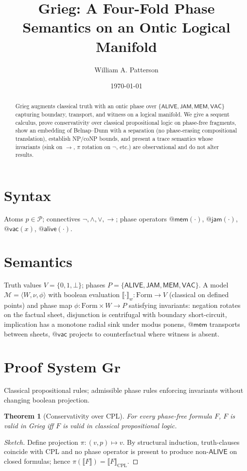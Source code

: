 \documentclass[11pt]{article}
\title{Grieg: A Four-Fold Phase Semantics on an Ontic Logical Manifold}
\author{William A. Patterson}
\date{\today}
\newtheorem{theorem}{Theorem}
\begin{document}
\maketitle

\begin{abstract}
Grieg augments classical truth with an ontic phase over $\{\mathsf{ALIVE},\mathsf{JAM},\mathsf{MEM},\mathsf{VAC}\}$ capturing boundary, transport, and witness on a logical manifold. We give a sequent calculus, prove conservativity over classical propositional logic on phase-free fragments, show an embedding of Belnap--Dunn with a separation (no phase-erasing compositional translation), establish NP/coNP bounds, and present a trace semantics whose invariants (sink on $\to$, $\pi$ rotation on $\neg$, etc.) are observational and do not alter results.
\end{abstract}

\section{Syntax}
Atoms $p\in\mathcal{P}$; connectives $\neg,\wedge,\vee,\to$; phase operators $\mathsf{@mem}(\cdot)$, $\mathsf{@jam}(\cdot)$, $\mathsf{@vac}(x)$, $\mathsf{@alive}(\cdot)$.

\section{Semantics}
Truth values $V=\{0,1,\bot\}$; phases $P=\{\mathsf{ALIVE},\mathsf{JAM},\mathsf{MEM},\mathsf{VAC}\}$. A model $\mathcal{M}=\langle W,\nu,\phi\rangle$ with boolean evaluation $\llbracket\cdot\rrbracket_w:\mathrm{Form}\to V$ (classical on defined points) and phase map $\phi:\mathrm{Form}\times W\to P$ satisfying invariants: negation rotates on the factual sheet, disjunction is centrifugal with boundary short-circuit, implication has a monotone radial sink under modus ponens, $\mathsf{@mem}$ transports between sheets, $\mathsf{@vac}$ projects to counterfactual where witness is absent.

\section{Proof System $\mathbf{G\!r}$}
Classical propositional rules; admissible phase rules enforcing invariants without changing boolean projection.

\begin{theorem}[Conservativity over CPL]
For every phase-free formula $F$, $F$ is valid in Grieg iff $F$ is valid in classical propositional logic.
\end{theorem}
\begin{proof}[Sketch]
Define projection $\pi:(v,p)\mapsto v$. By structural induction, truth-clauses coincide with CPL and no phase operator is present to produce non-$\mathsf{ALIVE}$ on closed formulas; hence $\pi(\llbracket F\rrbracket)=\llbracket F\rrbracket_{\mathrm{CPL}}$.
\end{proof}
\end{document}
